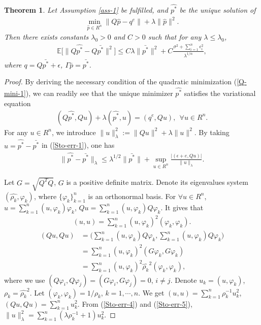 \documentclass[11pt]{article}
\newtheorem{theorem}{Theorem}[section]
\numberwithin{equation}{section}
\begin{document}
\begin{theorem}\label{Th-sto-1}
Let Assumption \ref{ass-1} be fulfilled, and $\hat{p^*}$ be the unique solution of 
\begin{align}\label{Q-mini-1}
\min\limits_{\hat{p}\in R^n} \|Q\hat{p}-q^e\| + \lambda\|\hat{p}\|^2.
\end{align}
Then there exists constants $\lambda_0>0$ and $C>0$ such that for any $\lambda\leq\lambda_0$,
\begin{align*}
\mathbb{E}\big[\|Q\hat{p^*}-Q\bar{p^*}\|^2\big]\leq C\lambda\|\bar{p^*}\|^2+C\frac{\sigma^2+\sum_{i=1}^n\epsilon_i^2}{\lambda^{1/\alpha}},
\end{align*}
where $q=Q\bar{p^*}+\epsilon$, $\Gamma\bar{p}=\bar{p^*}$.
\end{theorem}
\begin{proof} 
By deriving the necessary condition of the quadratic minimization (\ref{Q-mini-1}), we can readily see that the unique minimizer $\hat{p^*}$ satisfies the
variational equation
\begin{align}\label{Sto-err-1}
(Q\hat{p^*},Qu)+\lambda(\hat{p^*},u)=(q^e,Qu),~~\forall u\in R^n.
\end{align}
For any $u\in R^n$, we introduce $\| u \|_{\lambda}^2:=\|Qu\|^2+\lambda\|u\|^2$. By taking $u=\hat{p^*}-\bar{p^*}$ in (\ref{Sto-err-1}), one has
\begin{align}\label{Sto-err-3}
\| \hat{p^*}-\bar{p^*}\|_{\lambda}\leq \lambda^{1/2}\|\bar{p^*}\|+\sup\limits_{u\in R^n}\frac{|(\epsilon+e,Qu)|}{\| u \|_{\lambda}}.
\end{align}

Let $G=\sqrt{Q^TQ}$, $G$ is a positive definite matrix. Denote its eigenvalues system $(\hat{\rho_k},\varphi_k)$, where $\{\varphi_k\}_{k=1}^n$ is an orthonormal basis.
For $\forall u\in R^n$, $u=\sum_{k=1}^n(u,\varphi_k)\varphi_k$, $Qu=\sum_{k=1}^n(u,\varphi_k)Q\varphi_k$. It gives that
\begin{align}\label{Sto-err-4}
(u,u)=\sum_{k=1}^n(u,\varphi_k)^2(\varphi_k,\varphi_k).
\end{align}
\begin{align}\label{Sto-err-5}
(Qu,Qu)
&=\bigg(\sum_{k=1}^n(u,\varphi_k)Q\varphi_k,\sum_{k=1}^n(u,\varphi_k)Q\varphi_k\bigg)\\ \nonumber
&=\sum_{k=1}^n(u,\varphi_k)^2(G\varphi_k,G\varphi_k)\\ \nonumber
&=\sum_{k=1}^n(u,\varphi_k)^2\hat{\rho_k}^2(\varphi_k,\varphi_k),
\end{align}
where we use $(Q\varphi_i,Q\varphi_j)=(G\varphi_i,G\varphi_j)=0$, $i\neq j$. Denote 
$u_k=(u,\varphi_k)$, $\rho_k=\hat{\rho_k}^2$. Let $(\varphi_k,\varphi_k)=1/\rho_k$, $k=1,\cdots,n$. We get $(u,u)=\sum_{k=1}^n\rho_k^{-1}u_k^2$, $(Qu,Qu)=\sum_{k=1}^nu_k^2$.
From (\ref{Sto-err-4}) and (\ref{Sto-err-5}), $\| u\|_{\lambda}^2=\sum_{k=1}^n(\lambda\rho_k^{-1}+1)u_k^2$.


\end{proof}
\end{document}
